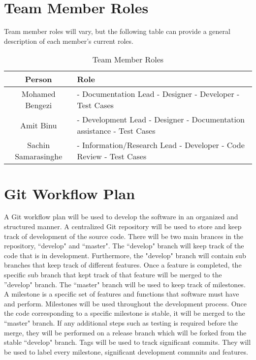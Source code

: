 \documentclass[12pt]{article}
\begin{document}
\section{Team Member Roles}
Team member roles will vary, but the following table can provide a general description of each member's current roles. 
\begin{table}[h]
\begin{center}
\begin{tabular}{ | c | p{65mm} |  }
\hline
 Person & Role  \\ 
\hline
Mohamed Bengezi & - Documentation Lead \newline - Designer \newline - Developer \newline - Test Cases  \\  
\hline
 Amit Binu & - Development Lead \newline - Designer \newline - Documentation assistance \newline - Test Cases  \\
\hline
 Sachin Samarasinghe & - Information/Research Lead \newline - Developer \newline - Code Review \newline - Test Cases
\\
\hline 
\end{tabular}
\end{center}
\caption{Team Member Roles}
\end{table}

\newpage
\section{Git Workflow Plan}
\tab A Git workflow plan will be used to develop the software in an organized and structured manner. A centralized Git repository will be used to store and keep track of development of the source code. There will be two main brances in the repository, ``develop" and ``master". The ``develop" branch will keep track of the code that is in development. Furthermore, the "develop" branch will contain sub branches that keep track of different features. Once a feature is completed, the specific sub branch that kept track of that feature will be merged to the ”develop" branch. The ``master" branch will be used to keep track of milestones. A milestone is a specific set of features and functions that software must have and perform. Milestones will be used throughout the development process. Once the code corresponding to a specific milestone is stable, it will be merged to the ``master" branch. If any additional steps such as testing is required before the merge, they will be performed on a release branch which will be forked from the stable ``develop" branch. Tags will be used to track significant commits. They will be used to label every milestone, significant development commnits and features.
\end{document}
